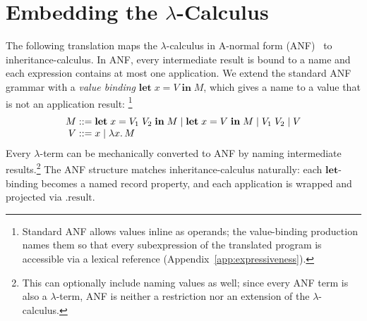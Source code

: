 
\section{Embedding the \texorpdfstring{$\lambda$}{λ}-Calculus}
\label{sec:translation}
\label{sec:forward-translation}

The following translation maps the $\lambda$-calculus in
A-normal form (ANF)~\cite{flanagan1993-essence-compiling-continuations} to inheritance-calculus.
In ANF, every intermediate result is bound to a name and each
expression contains at most one application.
We extend the standard ANF grammar with a \emph{value binding}
$\mathbf{let}\; x = V \;\mathbf{in}\; M$, which gives a name to a
value that is not an application result:%
\footnote{
  Standard ANF allows values inline as operands;
  the value-binding production names them so that every
  subexpression of the translated program is accessible
  via a lexical reference (Appendix~\ref{app:expressiveness}).
}
\[
  \begin{array}{r@{\;::=\;}l}
    M & \mathbf{let}\; x = V_1\; V_2 \;\mathbf{in}\; M
    \mid \mathbf{let}\; x = V \;\mathbf{in}\; M
    \mid V_1\; V_2
    \mid V \\
    V & x \mid \lambda x.\, M
  \end{array}
\]
Every $\lambda$-term can be mechanically converted to ANF by
naming intermediate results.\footnote{%
  This can optionally include naming values as well;
  since every ANF term is also a $\lambda$-term,
  ANF is neither a restriction nor an extension of the $\lambda$-calculus.
}
The ANF structure matches inheritance-calculus naturally: each
$\mathbf{let}$-binding becomes a named record property, and
each application is wrapped and projected via
$.\mathrm{result}$.

